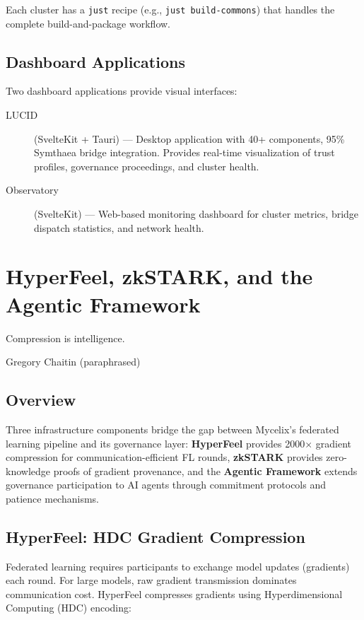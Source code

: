\documentclass[12pt]{book}
\begin{document}
Each cluster has a \texttt{just} recipe (e.g., \texttt{just build-commons})
that handles the complete build-and-package workflow.

\section{Dashboard Applications}

Two dashboard applications provide visual interfaces:

\begin{description}
  \item[LUCID] (SvelteKit + Tauri) --- Desktop application with 40+ components,
    95\% Symthaea bridge integration. Provides real-time visualization of
    trust profiles, governance proceedings, and cluster health.
  \item[Observatory] (SvelteKit) --- Web-based monitoring dashboard for
    cluster metrics, bridge dispatch statistics, and network health.
\end{description}


\chapter{HyperFeel, zkSTARK, and the Agentic Framework}
\label{ch:hyperfeel}

\epigraph{Compression is intelligence.}{Gregory Chaitin (paraphrased)}

\section{Overview}

Three infrastructure components bridge the gap between Mycelix's
federated learning pipeline and its governance layer: \textbf{HyperFeel}
provides 2000$\times$ gradient compression for communication-efficient
FL rounds, \textbf{zkSTARK} provides zero-knowledge proofs of gradient
provenance, and the \textbf{Agentic Framework} extends governance
participation to AI agents through commitment protocols and patience
mechanisms.

\section{HyperFeel: HDC Gradient Compression}

Federated learning requires participants to exchange model updates
(gradients) each round.  For large models, raw gradient transmission
dominates communication cost.  HyperFeel compresses gradients using
Hyperdimensional Computing (HDC) encoding:
\end{document}
